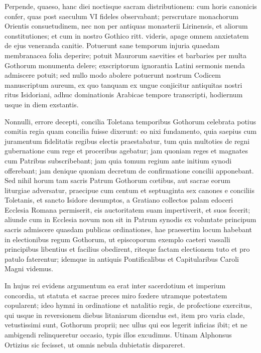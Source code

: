 \documentclass[letter,11pt]{book}
\begin{document}
 Perpende, quaeso, hanc diei noctisque sacram distributionem: cum horis canonicis confer, quas post saeculum VI fideles observabant; perscrutare monachorum Orientis consuetudinem, nec non per antiquas monasterii Lirinensis, et aliorum constitutiones; et cum in nostro Gothico ritt. videris, apage omnem anxietatem de ejus veneranda canitie. Potuerunt sane temporum injuria quaedam membranacea folia deperire; potuit Maurorum saevities et barbaries per multa Gothorum monumenta delere; exscriptorum ignorantia Latini sermonis menda admiscere potuit; sed nullo modo abolere potuerunt nostrum Codicem manuscriptum aureum, ex quo tanquam ex ungue conjicitur antiquitas nostri ritus Isidoriani, adhuc dominationis Arabicae tempore transcripti, hodiernum usque in diem exstantis.

Nonnulli, errore decepti, concilia Toletana temporibus Gothorum celebrata potius comitia regia quam concilia fuisse dixerunt: eo nixi fundamento, quia saepius cum juramentum fidelitatis regibus electis praestabatur, tum quia multoties de regni gubernatione cum rege et proceribus agebatur; jam quoniam reges et magnates cum Patribus subscribebant; jam quia tomum regium ante initium synodi offerebant; jam denique quoniam decretum de confirmatione concilii apponebant. Sed nihil horum tam sacris Patrum Gothorum cœtibus, aut sacrae eorum liturgiae adversatur, praecipue cum centum et septuaginta sex canones e conciliis Toletanis, et sancto Isidore desumptos, a Gratiano collectos palam edoceri Ecclesia Romana permiserit, eis auctoritatem suam impertiverit, et suos fecerit; aliunde cum in Ecclesia novum non sit in Patrum synodis ex voluntate principum sacris admiscere quasdam publicas ordinationes, hae praesertim locum habebant in electionibus regum Gothorum, ut episcoporum exemplo caeteri vassalli principibus libentius et facilius obedirent, riteque factam electionem tuto et pro patulo faterentur; idemque in antiquis Pontificalibus et Capitularibus Caroli Magni videmus.

In hujus rei evidens argumentum ea erat inter sacerdotium et imperium concordia, ut statuta et sacrae preces miro fœdere utramque potestatem copularent; ideo hymni in ordinatione et natalitio regis, de profectione exercitus, qui usque in reversionem diebus litaniarum dicendus est, item pro varia clade, vetustissimi sunt, Gothorum proprii; nec ullus qui eos legerit inficias ibit; et ne ambigendi relinqueretur occasio, typis illos excudimus. Utinam Alphonsus Ortizius sic fecisset, ut omnis nebula dubietatis dispareret.
\end{document}
